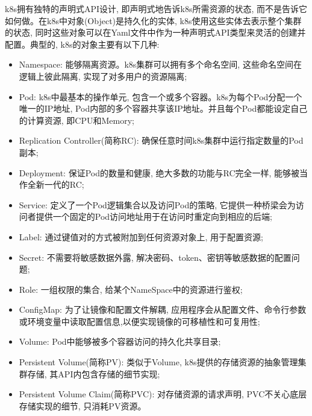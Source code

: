 k8s拥有独特的声明式API设计, 即声明式地告诉k8s所需资源的状态, 而不是告诉它如何做。在k8s中对象(Object)是持久化的实体, k8s使用这些实体去表示整个集群的状态, 同时这些对象可以在Yaml\cite{ben2009yaml}文件中作为一种声明式API类型来灵活的创建并配置。典型的, k8s的对象主要有以下几种: 

\begin{itemize}[itemindent=2em]
    \item Namespace: 能够隔离资源。k8s集群可以拥有多个命名空间, 这些命名空间在逻辑上彼此隔离, 实现了对多用户的资源隔离;

    \item Pod: k8s中最基本的操作单元, 包含一个或多个容器。k8s为每个Pod分配一个唯一的IP地址, Pod内部的多个容器共享该IP地址。并且每个Pod都能设定自己的计算资源, 即CPU和Memory;

    \item Replication Controller(简称RC): 确保任意时间k8s集群中运行指定数量的Pod副本;

    \item Deployment: 保证Pod的数量和健康, 绝大多数的功能与RC完全一样, 能够被当作全新一代的RC;

    \item Service: 定义了一个Pod逻辑集合以及访问Pod的策略, 它提供一种桥梁会为访问者提供一个固定的Pod访问地址用于在访问时重定向到相应的后端;

    \item Label: 通过键值对的方式被附加到任何资源对象上, 用于配置资源;

    \item Secret: 不需要将敏感数据外露, 解决密码、token、密钥等敏感数据的配置问题;

    \item Role: 一组权限的集合, 给某个NameSpace中的资源进行鉴权;

    \item ConfigMap: 为了让镜像和配置文件解耦, 应用程序会从配置文件、命令行参数或环境变量中读取配置信息,以便实现镜像的可移植性和可复用性;

    \item Volume: Pod中能够被多个容器访问的持久化共享目录;

    \item Persistent Volume(简称PV): 类似于Volume, k8s提供的存储资源的抽象管理集群存储, 其API内包含存储的细节实现;

    \item Persistent Volume Claim(简称PVC): 对存储资源的请求声明, PVC不关心底层存储实现的细节, 只消耗PV资源。

\end{itemize}

